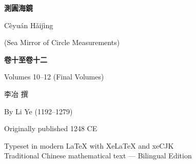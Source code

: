 \documentclass[11pt,a4paper]{article}
\begin{document}
\begin{titlepage}
\begin{center}
\vspace*{2cm}

{\Huge\bfseries\color{titlecolor} 測圓海鏡}

\vspace{0.8cm}
{\Large\color{sectioncolor} Cèyuán Hǎijìng}

\vspace{0.3cm}
{\normalsize\color{sectioncolor} (Sea Mirror of Circle Measurements)}

\vspace{1.5cm}
{\LARGE\bfseries 卷十至卷十二}

\vspace{0.3cm}
{\large Volumes 10--12 (Final Volumes)}

\vspace{2cm}


\vspace{2cm}
{\large 李冶 撰}

\vspace{0.3cm}
{\normalsize By Li Ye (1192--1279)}

\vspace{1.5cm}
{\small Originally published 1248 CE}

\vfill
{\small\color{notecolor}
Typeset in modern LaTeX with XeLaTeX and xeCJK\\
Traditional Chinese mathematical text — Bilingual Edition
}

\end{center}
\end{titlepage}

\tableofcontents
\newpage

\end{document}
